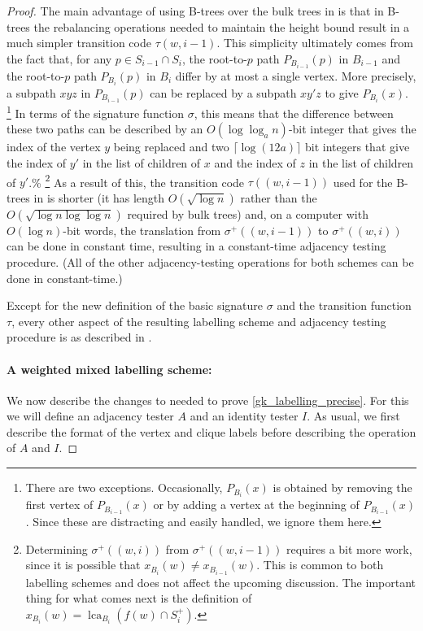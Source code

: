 \documentclass{patmorin}
\DeclareMathOperator{\lca}{lca}
\newcommand{\Oh}{O}
\begin{document}
\begin{proof}
  The main advantage of using B-trees over the bulk trees in \cite{dujmovic.esperet.ea:adjacency} is that in B-trees the rebalancing operations needed to maintain the height bound result in a much simpler transition code $\tau(w,i-1)$.
  This simplicity ultimately comes from the fact that, for any $p\in S_{i-1}\cap S_i$, the root-to-$p$ path $P_{B_{i-1}}(p)$ in $B_{i-1}$ and the root-to-$p$ path $P_{B_i}(p)$ in $B_i$ differ by at most a single vertex.
  More precisely, a subpath $xyz$ in $P_{B_{i-1}}(p)$ can be replaced by a subpath $xy'z$ to give $P_{B_i}(x)$.%
  \footnote{There are two exceptions. Occasionally, $P_{B_i}(x)$ is obtained by removing the first vertex of $P_{B_{i-1}}(x)$ or by adding a vertex at the beginning of $P_{B_{i-1}}(x)$. Since these are distracting and easily handled, we ignore them here.}
  In terms of the signature function $\sigma$, this means that the difference between these two paths can be described by an $\Oh(\log\log_a n)$-bit integer that gives the index of the vertex $y$ being replaced and two $\lceil\log (12a)\rceil$ bit integers that give the index of $y'$ in the list of children of $x$ and the index of $z$ in the list of children of $y'$.\%
  \footnote{Determining $\sigma^+((w,i))$ from $\sigma^+((w,i-1))$ requires a bit more work, since it is possible that $x_{B_i}(w)\neq x_{B_{i-1}}(w)$. This is common to both labelling schemes and does not affect the upcoming discussion. The important thing for what comes next is the definition of $x_{B_i}(w)=\lca_{B_i}(f(w)\cap S^+_i)$.}
    As a result of this, the transition code $\tau((w,i-1))$ used for the B-trees in \cite{gawrychowski.janczewski:simpler} is shorter (it has length $\Oh(\sqrt{\log n})$ rather than the $\Oh(\sqrt{\log n\log\log n})$ required by bulk trees) and, on a computer with $\Oh(\log n)$-bit words, the translation from $\sigma^+((w,i-1))$ to $\sigma^+((w,i))$ can be done in constant time, resulting in a constant-time adjacency testing procedure. (All of the other adjacency-testing operations for both schemes can be done in constant-time.)

    Except for the new definition of the basic signature $\sigma$ and the transition function $\tau$, every other aspect of the resulting labelling scheme and adjacency testing procedure is as described in \cite{dujmovic.esperet.ea:adjacency}.

    \paragraph{A weighted mixed labelling scheme:}
    We now describe the changes to \cite{gawrychowski.janczewski:simpler,dujmovic.esperet.ea:adjacency} needed to prove \cref{gk_labelling_precise}.  For this we will define an adjacency tester $A$ and an identity tester $I$. As usual, we first describe the format of the vertex and clique labels before describing the operation of $A$ and $I$.


\end{proof}
\end{document}
